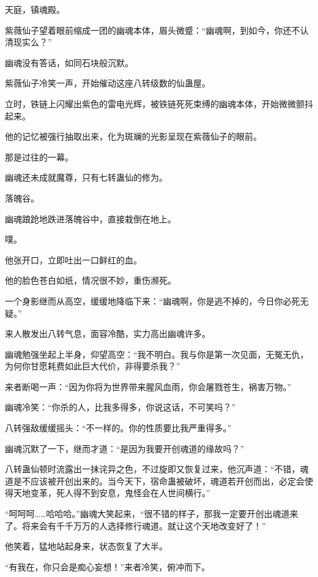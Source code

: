 
\begin{this_body}

天庭，镇魂殿。

紫薇仙子望着眼前缩成一团的幽魂本体，眉头微蹙：“幽魂啊，到如今，你还不认清现实么？”

幽魂没有答话，如同石块般沉默。

紫薇仙子冷笑一声，开始催动这座八转级数的仙蛊屋。

立时，铁链上闪耀出紫色的雷电光辉，被铁链死死束缚的幽魂本体，开始微微颤抖起来。

他的记忆被强行抽取出来，化为斑斓的光影呈现在紫薇仙子的眼前。

那是过往的一幕。

幽魂还未成就魔尊，只有七转蛊仙的修为。

落魄谷。

幽魂踉跄地跌进落魄谷中，直接栽倒在地上。

噗。

他张开口，立即吐出一口鲜红的血。

他的脸色苍白如纸，情况很不妙，重伤濒死。

一个身影继而从高空，缓缓地降临下来：“幽魂啊，你是逃不掉的，今日你必死无疑。”

来人散发出八转气息，面容冷酷，实力高出幽魂许多。

幽魂勉强坐起上半身，仰望高空：“我不明白。我与你是第一次见面，无冤无仇，为何你甘愿耗费如此巨大代价，非得要杀我？”

来者断喝一声：“因为你将为世界带来腥风血雨，你会屠戮苍生，祸害万物。”

幽魂冷笑：“你杀的人，比我多得多，你说这话，不可笑吗？”

八转强敌缓缓摇头：“不一样的。你的性质要比我严重得多。”

幽魂沉默了一下，继而才道：“是因为我要开创魂道的缘故吗？”

八转蛊仙顿时流露出一抹诧异之色，不过旋即又恢复过来，他沉声道：“不错，魂道是不应该被开创出来的。当今天下，宿命蛊被破坏，魂道若开创而出，必定会使得天地变革，死人得不到安息，鬼怪会在人世间横行。”

“呵呵呵……哈哈哈。”幽魂大笑起来，“很不错的样子，那我一定要开创出魂道来了。将来会有千千万万的人选择修行魂道。就让这个天地改变好了！”

他笑着，猛地站起身来，状态恢复了大半。

“有我在，你只会是痴心妄想！”来者冷笑，俯冲而下。


\end{this_body}
